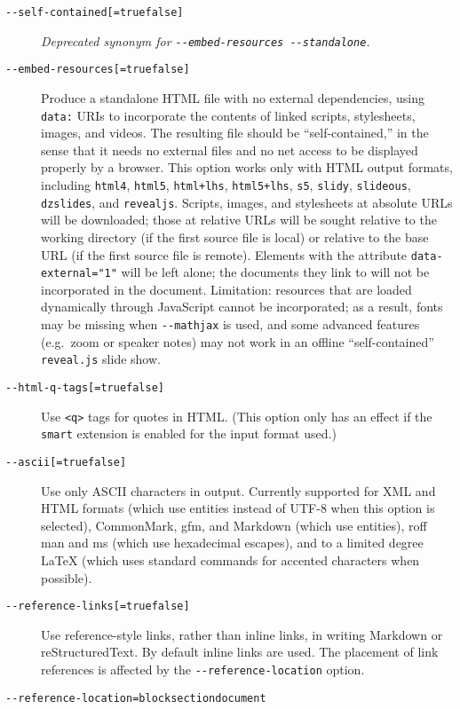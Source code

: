 \documentclass[
  a4paper,
]{article}
\begin{document}
\begin{description}
\item[\texttt{-\/-self-contained{[}=true\textbar{}false{]}}]
\emph{Deprecated synonym for
\texttt{-\/-embed-resources\ -\/-standalone}.}
\item[\texttt{-\/-embed-resources{[}=true\textbar{}false{]}}]
Produce a standalone HTML file with no external dependencies, using
\texttt{data:} URIs to incorporate the contents of linked scripts,
stylesheets, images, and videos. The resulting file should be
``self-contained,'' in the sense that it needs no external files and no
net access to be displayed properly by a browser. This option works only
with HTML output formats, including \texttt{html4}, \texttt{html5},
\texttt{html+lhs}, \texttt{html5+lhs}, \texttt{s5}, \texttt{slidy},
\texttt{slideous}, \texttt{dzslides}, and \texttt{revealjs}. Scripts,
images, and stylesheets at absolute URLs will be downloaded; those at
relative URLs will be sought relative to the working directory (if the
first source file is local) or relative to the base URL (if the first
source file is remote). Elements with the attribute
\texttt{data-external="1"} will be left alone; the documents they link
to will not be incorporated in the document. Limitation: resources that
are loaded dynamically through JavaScript cannot be incorporated; as a
result, fonts may be missing when \texttt{-\/-mathjax} is used, and some
advanced features (e.g.~zoom or speaker notes) may not work in an
offline ``self-contained'' \texttt{reveal.js} slide show.
\item[\texttt{-\/-html-q-tags{[}=true\textbar{}false{]}}]
Use \texttt{\textless{}q\textgreater{}} tags for quotes in HTML. (This
option only has an effect if the \texttt{smart} extension is enabled for
the input format used.)
\item[\texttt{-\/-ascii{[}=true\textbar{}false{]}}]
Use only ASCII characters in output. Currently supported for XML and
HTML formats (which use entities instead of UTF-8 when this option is
selected), CommonMark, gfm, and Markdown (which use entities), roff man
and ms (which use hexadecimal escapes), and to a limited degree LaTeX
(which uses standard commands for accented characters when possible).
\item[\texttt{-\/-reference-links{[}=true\textbar{}false{]}}]
Use reference-style links, rather than inline links, in writing Markdown
or reStructuredText. By default inline links are used. The placement of
link references is affected by the \texttt{-\/-reference-location}
option.
\item[\texttt{-\/-reference-location=block}\textbar{}\texttt{section}\textbar{}\texttt{document}]

\end{description}
\end{document}
